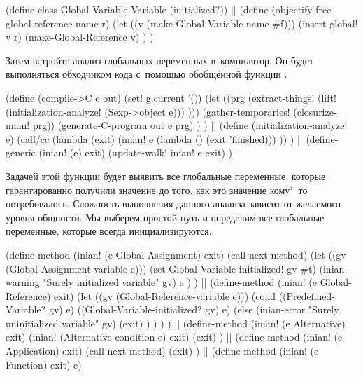 \begin{code:lisp}
(define-class Global-Variable Variable (initialized?))
||
(define (objectify-free-global-reference name r)
  (let ((v (make-Global-Variable name #f)))
    (insert-global! v r)
    (make-Global-Reference v) ) )
\end{code:lisp}

Затем встройте анализ глобальных переменных в~компилятор. Он будет выполняться
обходчиком кода с~помощью обобщённой функции .

\begin{code:lisp}
(define (compile->C e out)
  (set! g.current '())
  (let ((prg (extract-things!
              (lift! (initialization-analyze! (Sexp->object e))) )))
    (gather-temporaries! (closurize-main! prg))
    (generate-C-program out e prg) ) )
||
(define (initialization-analyze! e)
  (call/cc (lambda (exit)
             (inian! e (lambda () (exit 'finished))) )) )
||
(define-generic (inian! (e) exit)
  (update-walk! inian! e exit) )
\end{code:lisp}

Задачей этой функции будет выявить все глобальные переменные, которые
гарантированно получили значение до того, как это значение кому"~то
потребовалось. Сложность выполнения данного анализа зависит от желаемого уровня
общности. Мы выберем простой путь и определим все глобальные переменные, которые
всегда инициализируются.

\begin{code:lisp}
(define-method (inian! (e Global-Assignment) exit)
  (call-next-method)
  (let ((gv (Global-Assignment-variable e)))
    (set-Global-Variable-initialized! gv #t)
    (inian-warning "Surely initialized variable" gv)
    e ) )
||
(define-method (inian! (e Global-Reference) exit)
  (let ((gv (Global-Reference-variable e)))
    (cond ((Predefined-Variable? gv) e)
          ((Global-Variable-initialized? gv) e)
          (else (inian-error "Surely uninitialized variable" gv)
                (exit) ) ) ) )
||
(define-method (inian! (e Alternative) exit)
  (inian! (Alternative-condition e) exit)
  (exit) )
||
(define-method (inian! (e Application) exit)
  (call-next-method)
  (exit) )
||
(define-method (inian! (e Function) exit) e)
\end{code:lisp}

